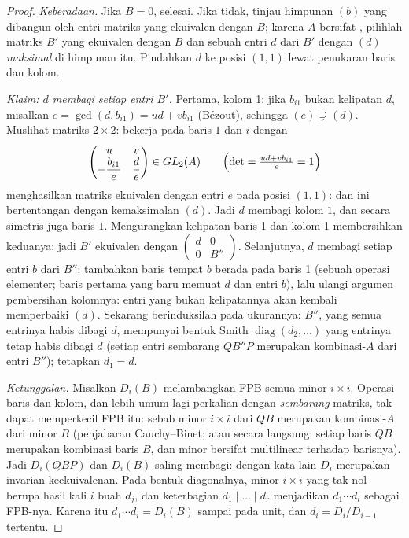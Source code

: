 \begin{proof}
\emph{Keberadaan.} Jika $B = 0$, selesai. Jika tidak, tinjau himpunan
 $(b)$ yang dibangun oleh entri matriks yang ekuivalen dengan $B$;
karena $A$ bersifat , pilihlah matriks $B'$ yang ekuivalen dengan $B$
dan sebuah entri $d$ dari $B'$ dengan $(d)$ \emph{maksimal} di himpunan itu.
Pindahkan $d$ ke posisi $(1,1)$ lewat penukaran baris dan kolom.

\emph{Klaim: $d$ membagi setiap entri $B'$.} Pertama, kolom 1: jika
$b_{i1}$ bukan kelipatan $d$, misalkan $e = \gcd(d, b_{i1}) = ud +
vb_{i1}$ (Bézout), sehingga $(e) \supsetneq (d)$. Muslihat matriks
$2 \times 2$: bekerja pada baris $1$ dan $i$ dengan
\[
\begin{pmatrix} u & v \\ -\dfrac{b_{i1}}e & \dfrac de
\end{pmatrix}
\in GL_2(A)
\qquad
\Bigl(\det = \tfrac{ud + v b_{i1}}e = 1\Bigr)
\]
menghasilkan matriks ekuivalen dengan entri $e$ pada posisi $(1,1)$:
dan ini bertentangan dengan kemaksimalan $(d)$. Jadi $d$ membagi kolom $1$,
dan secara simetris juga baris $1$. Mengurangkan kelipatan baris 1 dan
kolom 1 membersihkan keduanya: jadi $B'$ ekuivalen dengan $\begin{pmatrix} d &
0\\ 0 & B''\end{pmatrix}$. Selanjutnya, $d$ membagi setiap entri $b$ dari
$B''$: tambahkan baris tempat $b$ berada pada baris 1 (sebuah operasi elementer; baris
pertama yang baru memuat $d$ dan entri $b$), lalu ulangi
argumen pembersihan kolomnya: entri yang bukan kelipatannya akan kembali memperbaiki
$(d)$. Sekarang berinduksilah pada ukurannya: $B''$, yang semua entrinya
habis dibagi $d$, mempunyai bentuk Smith $\operatorname{diag}(d_2,
\dots)$ yang entrinya tetap habis dibagi $d$ (setiap entri sembarang
$QB''P$ merupakan kombinasi-$A$ dari entri $B''$); tetapkan $d_1 =
d$.

\emph{Ketunggalan.} Misalkan $D_i(B)$ melambangkan FPB semua minor $i \times i$.
Operasi baris dan kolom, dan lebih umum lagi
perkalian dengan \emph{sembarang} matriks, tak dapat memperkecil FPB itu: sebab
minor $i \times i$ dari $QB$ merupakan kombinasi-$A$ dari minor $B$
(penjabaran Cauchy--Binet; atau secara langsung: setiap baris $QB$ merupakan
kombinasi baris $B$, dan minor bersifat multilinear terhadap barisnya).
Jadi $D_i(QBP)$ dan $D_i(B)$ saling membagi: dengan kata lain $D_i$ merupakan
invarian keekuivalenan. Pada bentuk diagonalnya, minor $i
\times i$ yang tak nol berupa hasil kali $i$ buah $d_j$, dan
keterbagian $d_1 \mid \dots \mid d_r$ menjadikan $d_1 \cdots d_i$ sebagai
FPB-nya. Karena itu $d_1 \cdots d_i = D_i(B)$ sampai pada unit, dan $d_i =
D_i/D_{i-1}$ tertentu.
\end{proof}

